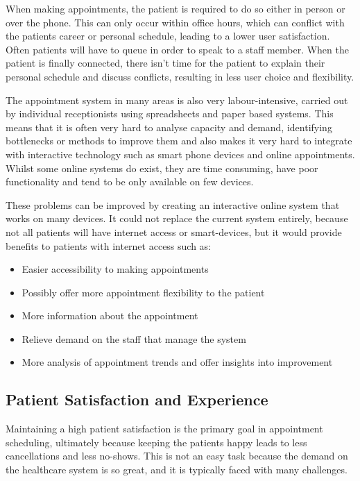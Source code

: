 When making appointments, the patient is required to do so either in person or over the phone. This can only occur within office hours, which can conflict with the patients career or personal schedule, leading to a lower user satisfaction. Often patients will have to queue in order to speak to a staff member. When the patient is finally connected, there isn't time for the patient to explain their personal schedule and discuss conflicts, resulting in less user choice and flexibility.

The appointment system in many areas is also very labour-intensive, carried out by individual receptionists using spreadsheets and paper based systems\cite{ApointProcWebsite}. This means that it is often very hard to analyse capacity and demand, identifying bottlenecks or methods to improve them and also makes it very hard to integrate with interactive technology such as smart phone devices and online appointments. Whilst some online systems do exist\cite{C&BWebsite}, they are time consuming, have poor functionality and tend to be only available on few devices\cite{C&BFailure}. 

These problems can be improved by creating an interactive online system that works on many devices. It could not replace the current system entirely, because not all patients will have internet access or smart-devices, but it would provide benefits to patients with internet access such as:

\begin{itemize}
	\item Easier accessibility to making appointments
	\item Possibly offer more appointment flexibility to the patient
	\item More information about the appointment
	\item Relieve demand on the staff that manage the system
	\item More analysis of appointment trends and offer insights into improvement
\end{itemize}

\subsection{Patient Satisfaction and Experience}

Maintaining a high patient satisfaction is the primary goal in appointment scheduling, ultimately because keeping the patients happy leads to less cancellations and less no-shows. This is not an easy task because the demand on the healthcare system is so great, and it is typically faced with many challenges.

